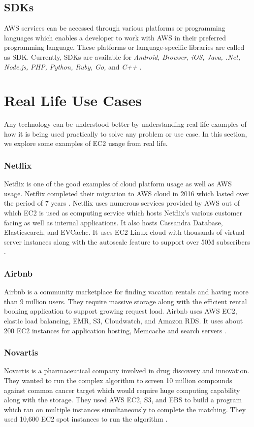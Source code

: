 \subsection{SDKs}
AWS services can be accessed through various platforms or programming languages which enables a developer to work with AWS in their preferred programming language. These platforms or language-specific libraries are called as SDK. Currently, SDKs are available for \emph{Android, Browser, iOS, Java, .Net, Node.js, PHP, Python, Ruby, Go,} and \emph{C++} \cite{hid-sp18-402-www-aws-ec2-sdk}. 

\section{Real Life Use Cases}
Any technology can be understood better by understanding real-life examples of how it is being used practically to solve any problem or use case. In this section, we explore some examples of EC2 usage from real life.

\subsubsection{Netflix}
Netflix is one of the good examples of cloud platform usage as well as AWS usage. Netflix completed their migration to AWS cloud in 2016 which lasted over the period of 7 years \cite{hid-sp18-402-www-media-netflix}. Netflix uses numerous services provided by AWS out of which EC2 is used as computing service which hosts Netflix's various customer facing as well as internal applications. It also hosts Cassandra Database, Elasticsearch, and EVCache. It uses EC2 Linux cloud with thousands of virtual server instances along with the autoscale feature to support over 50M subscribers \cite{hid-sp18-402-www-brendangregg}.

\subsubsection{Airbnb}
Airbnb is a community marketplace for finding vacation rentals and having more than 9 million users. They require massive storage along with the efficient rental booking application to support growing request load. Airbnb uses AWS EC2, elastic load balancing, EMR, S3, Cloudwatch, and Amazon RDS. It uses about 200 EC2 instances for application hosting, Memcache and search servers \cite{hid-sp18-402-www-aws-ec2-airbnb}.

\subsubsection{Novartis}
Novartis is a pharmaceutical company involved in drug discovery and innovation. They wanted to run the complex algorithm to screen 10 million compounds against common cancer target which would require huge computing capability along with the storage. They used AWS EC2, S3, and EBS to build a program which ran on multiple instances simultaneously to complete the matching. They used 10,600 EC2 spot instances to run the algorithm \cite{hid-sp18-402-www-aws-ec2-novartis}.

